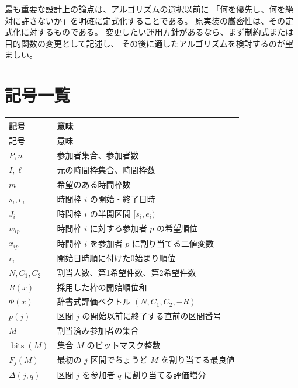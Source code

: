 \documentclass[11pt,a4paper]{ltjsarticle}
\theoremstyle{definition}
\theoremstyle{remark}
\newcommand{\bits}{\operatorname{bits}}
\begin{document}
最も重要な設計上の論点は、アルゴリズムの選択以前に
「何を優先し、何を絶対に許さないか」を明確に定式化することである。
原実装の厳密性は、その定式化に対するものである。
変更したい運用方針があるなら、まず制約式または目的関数の変更として記述し、
その後に適したアルゴリズムを検討するのが望ましい。

\appendix
\section{記号一覧}
\begin{longtable}{p{34mm}p{\dimexpr\linewidth-45mm\relax}}
\toprule
記号 & 意味 \\
\midrule
\endfirsthead
\toprule 記号 & 意味 \\ \midrule
\endhead
$P,n$ & 参加者集合、参加者数 \\
$I,\ell$ & 元の時間枠集合、時間枠数 \\
$m$ & 希望のある時間枠数 \\
$s_i,e_i$ & 時間枠 $i$ の開始・終了日時 \\
$J_i$ & 時間枠 $i$ の半開区間 $[s_i,e_i)$ \\
$w_{ip}$ & 時間枠 $i$ に対する参加者 $p$ の希望順位 \\
$x_{ip}$ & 時間枠 $i$ を参加者 $p$ に割り当てる二値変数 \\
$r_i$ & 開始日時順に付けた0始まり順位 \\
$N,C_1,C_2$ & 割当人数、第1希望件数、第2希望件数 \\
$R(x)$ & 採用した枠の開始順位和 \\
$\Phi(x)$ & 辞書式評価ベクトル $(N,C_1,C_2,-R)$ \\
$p(j)$ & 区間 $j$ の開始以前に終了する直前の区間番号 \\
$M$ & 割当済み参加者の集合 \\
$\bits(M)$ & 集合 $M$ のビットマスク整数 \\
$F_j(M)$ & 最初の $j$ 区間でちょうど $M$ を割り当てる最良値 \\
$\Delta(j,q)$ & 区間 $j$ を参加者 $q$ に割り当てる評価増分 \\
\bottomrule
\end{longtable}
\end{document}

